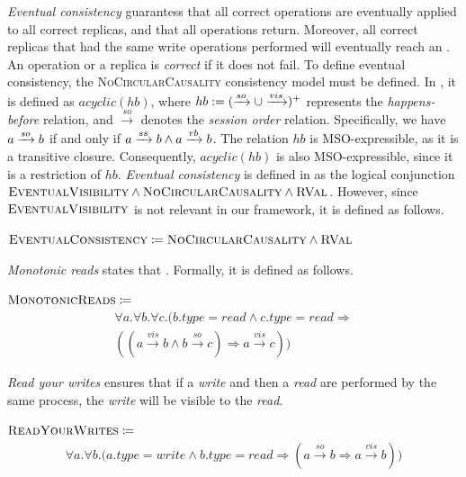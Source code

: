 \documentclass[12pt]{article}
\begin{document}
\textsl{Eventual consistency} guarantess that all correct operations are eventually applied to all correct replicas, and that all operations return. Moreover, all correct replicas that had the same write operations performed will eventually reach an . An operation or a replica is \textsl{correct} if it does not fail. To define eventual consistency, the \textsc{NoCircularCausality} consistency model must be defined. In \cite{ViottiVukolic}, it is defined as \mbox{$acyclic(hb)$}, where $hb := (\xrightarrow{so} \cup \xrightarrow{vis})^+$ represents the \textsl{happens-before} relation, and $\xrightarrow{so}$ denotes the \textsl{session order} relation. Specifically, we have $a \xrightarrow{so} b$ if and only if $a \xrightarrow{ss} b \land a \xrightarrow{rb} b$. The relation $hb$ is MSO-expressible, as it is a transitive closure. Consequently, $acyclic(hb)$ is also MSO-expressible, since it is a restriction of $hb$. \textsl{Eventual consistency} is defined in \cite{ViottiVukolic} as the logical conjunction \mbox{$\textsc{EventualVisibility}\land\textsc{NoCircularCausality}\land\textsc{RVal}$}. However, since $\textsc{EventualVisibility}$ is not relevant in our framework, it is defined as follows.

\begin{center}
$\textsc{EventualConsistency} \coloneqq \textsc{NoCircularCausality}\land\textsc{RVal}$
\end{center}

\textsl{Monotonic reads} states that \cite{ViottiVukolic}. Formally, it is defined as follows.

$\textsc{MonotonicReads} \coloneqq$
\begin{gather*}
\forall a. \forall b.\forall c.\Big( b.type=read\land c.type=read \Rightarrow \\
((a\xrightarrow{vis}b\land b\xrightarrow{so}c)\Rightarrow a\xrightarrow{vis}c ) \Big)
\end{gather*}

\textsl{Read your writes} ensures that if a \textsl{write} and then a \textsl{read} are performed by the same process, the \textsl{write} will be visible to the \textsl{read}.

$\textsc{ReadYourWrites} \coloneqq$
\begin{gather*}
\forall	a.\forall b.\Big( a.type=write\land b.type=read\Rightarrow ( a\xrightarrow{so}b \Rightarrow a\xrightarrow{vis}b  ) \Big)
\end{gather*}
\end{document}
